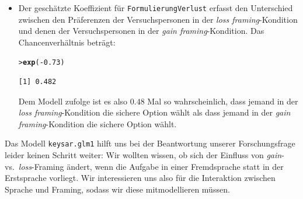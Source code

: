 \documentclass[oneside, 10pt]{book}\usepackage[]{graphicx}\usepackage[]{xcolor}
\makeatletter
\newcommand{\hlnum}[1]{\textcolor[rgb]{0.686,0.059,0.569}{#1}}%
\newcommand{\hlopt}[1]{\textcolor[rgb]{0,0,0}{#1}}%
\newcommand{\hlstd}[1]{\textcolor[rgb]{0.345,0.345,0.345}{#1}}%
\newcommand{\hlkwd}[1]{\textcolor[rgb]{0.737,0.353,0.396}{\textbf{#1}}}%
\newenvironment{kframe}{%
 \def\at@end@of@kframe{}%
 \ifinner\ifhmode%
  \def\at@end@of@kframe{\end{minipage}}%
  \begin{minipage}{\columnwidth}%
 \fi\fi%
 \def\FrameCommand##1{\hskip\@totalleftmargin \hskip-\fboxsep
 \colorbox{shadecolor}{##1}\hskip-\fboxsep
     \hskip-\linewidth \hskip-\@totalleftmargin \hskip\columnwidth}%
 \MakeFramed {\advance\hsize-\width
   \@totalleftmargin\z@ \linewidth\hsize
   \@setminipage}}%
 {\par\unskip\endMakeFramed%
 \at@end@of@kframe}
\newenvironment{knitrout}{}{} %
\makeatother
\begin{document}
\begin{itemize}
 \item Der geschätzte Koeffizient für \texttt{FormulierungVerlust}
  erfasst den Unterschied zwischen den Präferenzen der Versuchspersonen
  in der \textit{loss framing}-Kondition und denen der Versuchspersonen
  in der \textit{gain framing}-Kondition. Das Chancenverhältnis beträgt:
\begin{knitrout}
\color{fgcolor}\begin{kframe}
\begin{alltt}
\hlstd{> }\hlkwd{exp}\hlstd{(}\hlopt{-}\hlnum{0.73}\hlstd{)}
\end{alltt}
\begin{verbatim}
[1] 0.482
\end{verbatim}
\end{kframe}
\end{knitrout}
  Dem Modell zufolge ist es also $0.48$ Mal so wahrscheinlich,
  dass jemand in der \textit{loss framing}-Kondition die sichere Option wählt
  als dass jemand in der \textit{gain framing}-Kondition die sichere Option wählt.
\end{itemize}

Das Modell \texttt{keysar.glm1} hilft uns bei der Beantwortung
unserer Forschungsfrage leider keinen Schritt weiter:
Wir wollten wissen, ob sich der Einfluss von \textit{gain}-
vs.\ \textit{loss}-Framing ändert, wenn die Aufgabe in einer
Fremdsprache statt in der Erstsprache vorliegt. Wir interessieren
uns also für die Interaktion zwischen Sprache und Framing, sodass
wir diese mitmodellieren müssen.
\end{document}
